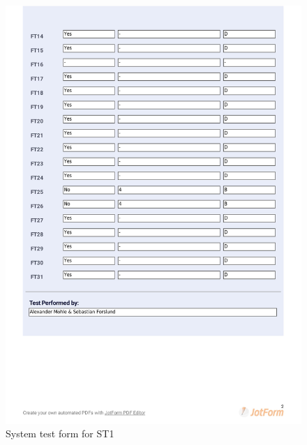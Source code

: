 \documentclass{article}
\begin{document}
 \begin{figure}
     \centering
     \includegraphics[width=13cm]{images/2021-03-04_Alexander_ST1-2}
     \renewcommand\figurename{Figure}
     \caption{System test form for ST1}
     \label{fig:my_label}
 \end{figure}
\end{document}
